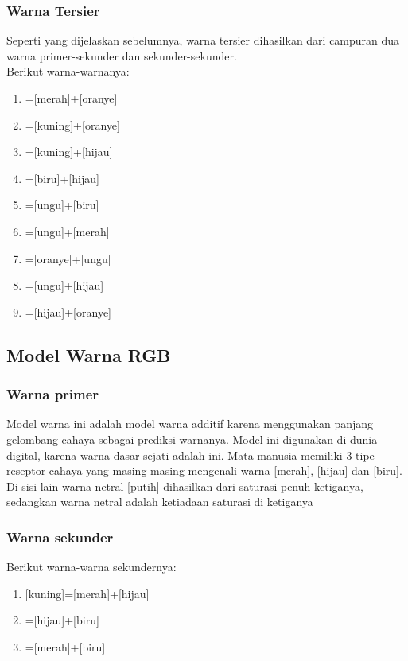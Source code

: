 \documentclass[a4paper]{article}
\newcommand{\warnalnbl}[1]{
  \tikz[baseline=-0.5\ht\strutbox]{
    \node[shape=rectangle, draw=black, fill=black, minimum height=1.5em, inner sep= 2pt, text=white]{#1}
  }
}
\begin{document}
\subsubsection{Warna Tersier}
Seperti yang dijelaskan sebelumnya, warna tersier dihasilkan dari campuran dua warna primer-sekunder dan sekunder-sekunder.\\
Berikut warna-warnanya:
\begin{enumerate}
  \item {}=[merah]+[oranye]
  \item {}=[kuning]+[oranye]
  \item {}=[kuning]+[hijau]
  \item {}=[biru]+[hijau]
  \item {}=[ungu]+[biru]
  \item {}=[ungu]+[merah]
  \item {}=[oranye]+[ungu]
  \item {}=[ungu]+[hijau]
  \item {}=[hijau]+[oranye]
\end{enumerate}

\subsection{Model Warna RGB}
\subsubsection{Warna primer}
Model warna ini adalah model warna additif karena menggunakan panjang gelombang cahaya sebagai prediksi warnanya. Model ini digunakan di dunia digital, karena warna dasar sejati adalah ini. Mata manusia memiliki 3 tipe reseptor cahaya yang masing masing mengenali warna [merah], [hijau] dan [biru]. Di sisi lain warna netral [putih] dihasilkan dari saturasi penuh ketiganya, sedangkan warna netral \warnalnbl{Hitam} adalah ketiadaan saturasi di ketiganya

\subsubsection{Warna sekunder}
Berikut warna-warna sekundernya:
\begin{enumerate}
  \item {}[kuning]=[merah]+[hijau]
  \item {}=[hijau]+[biru]
  \item {}=[merah]+[biru]
\end{enumerate}
\end{document}
